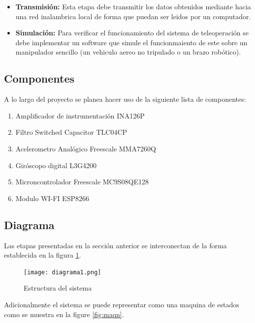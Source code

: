 \documentclass{article}
\begin{document}
\begin{itemize}
	\item \textbf{Transmisión:} Esta etapa debe transmitir los datos obtenidos mediante hacia una red inalambrica local de forma que puedan ser leidos por un computador.
\end{itemize}

\begin{itemize}
	\item \textbf{Simulación:} Para verificar el funcionamiento del sistema de teleoperaci\'on se debe implementar un software que simule el funcionmaiento de este sobre un manipulador sencillo (un vehiculo aereo no tripulado o un brazo rob\'otico).
\end{itemize}

\subsection{Componentes}
A lo largo del proyecto se planea hacer uso de la siguiente lista de componentes:

\begin{enumerate}
	\item Amplificador de instrumentaci\'on INA126P
	\item Filtro Switched Capacitor TLC04CP
	\item Acelerometro Anal\'ogico Freescale MMA7260Q
	\item Gir\'oscopo digital L3G4200
	\item Microncontrolador Freescale MC9S08QE128
	\item Modulo WI-FI ESP8266
\end{enumerate}
\newpage
\subsection{Diagrama}

Las etapas presentadas en la secci\'on anterior se interconectan de la forma establecida en la figura \ref{fig:estructura_proyecto}.

\begin{figure}[h!]
    \centering
    \texttt{[image: diagrama1.png]}
    \caption{Estructura del sistema}
    \label{fig:estructura_proyecto}
\end{figure}

Adicionalmente el sistema se puede representar como una maquina de estados como se muestra en la figure \ref{fig:maqn}.
\end{document}
